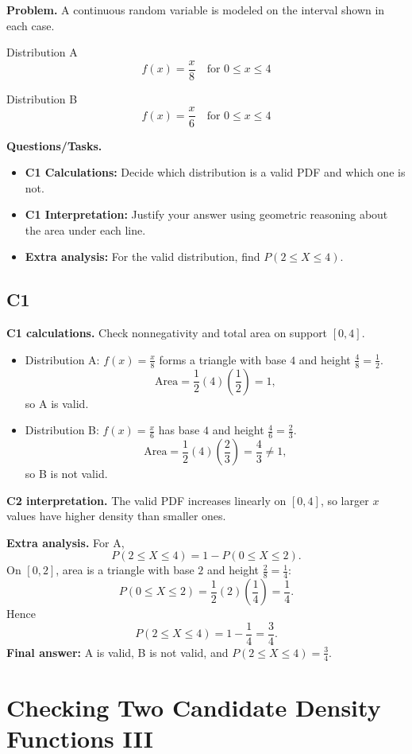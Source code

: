 	\textbf{Problem.}
	A continuous random variable is modeled on the interval shown in each case.
	
	Distribution A
	\[
	f(x)=\frac{x}{8}\quad\text{for }0\le x\le 4
	\]
	
	Distribution B
	\[
	f(x)=\frac{x}{6}\quad\text{for }0\le x\le 4
	\]
	
	\textbf{Questions/Tasks.}
	\begin{itemize}
		\item \textbf{C1 Calculations:} Decide which distribution is a valid PDF and which one is not.
		\item \textbf{C1 Interpretation:} Justify your answer using geometric reasoning about the area under each line.
		\item \textbf{Extra analysis:} For the valid distribution, find $P(2\le X\le 4)$.
	\end{itemize}

	\subsection*{C1}

\textbf{C1 calculations.}
Check nonnegativity and total area on support $[0,4]$.
\begin{itemize}
	\item Distribution A: $f(x)=\frac{x}{8}$ forms a triangle with base $4$ and height $\frac{4}{8}=\frac12$.
	\[
	\text{Area}=\frac12(4)\left(\frac12\right)=1,
	\]
	so A is valid.
	\item Distribution B: $f(x)=\frac{x}{6}$ has base $4$ and height $\frac{4}{6}=\frac23$.
	\[
	\text{Area}=\frac12(4)\left(\frac23\right)=\frac43\ne1,
	\]
	so B is not valid.
\end{itemize}

\textbf{C2 interpretation.}
The valid PDF increases linearly on $[0,4]$, so larger $x$ values have higher density than smaller ones.

\textbf{Extra analysis.}
For A,
\[
P(2\le X\le4)=1-P(0\le X\le2).
\]
On $[0,2]$, area is a triangle with base $2$ and height $\frac{2}{8}=\frac14$:
\[
P(0\le X\le2)=\frac12(2)\left(\frac14\right)=\frac14.
\]
Hence
\[
P(2\le X\le4)=1-\frac14=\frac34.
\]
\textbf{Final answer:} A is valid, B is not valid, and $P(2\le X\le4)=\frac34$.

	\section{Checking Two Candidate Density Functions III}
	
